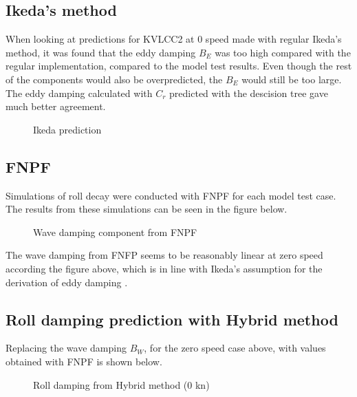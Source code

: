     \subsection{Ikeda's method}\label{ikedas-method}

    When looking at predictions for KVLCC2 at 0 speed made with regular
Ikeda's method, it was found that the eddy damping $B_E$ was too high
compared with the regular implementation, compared to the model test
results. Even though the rest of the components would also be
overpredicted, the $B_E$ would still be too large. The eddy damping
calculated with $C_r$ predicted with the descision tree gave much
better agreement.

    \begin{figure}
        \begin{center}\end{center}
        \caption{Ikeda prediction}
        \label{fig:ikeda}
    \end{figure}
    
    \subsection{FNPF}\label{fnpf}

Simulations of roll decay were conducted with FNPF for each model test
case. The results from these simulations can be seen in the figure
below.

    \begin{figure}
        \begin{center}\end{center}
        \caption{Wave damping component from FNPF}
        \label{fig:fnpf}
    \end{figure}
    
    The wave damping from FNFP seems to be reasonably linear at zero speed
according the figure above, which is in line with Ikeda's assumption for
the derivation of eddy damping \cite{7505983/4AFVVGNT}.

    \subsection{Roll damping prediction with Hybrid
method}\label{roll-damping-prediction-with-hybrid-method}
Replacing the wave damping $B_W$, for the zero speed case above, with values obtained with FNPF is shown below. 
    \begin{figure}
        \begin{center}\end{center}
        \caption{Roll damping from Hybrid method (0 kn)}
        \label{fig:hybrid_0}
    \end{figure}
    
